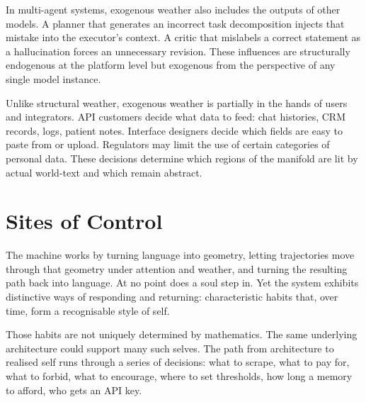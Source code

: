 \documentclass[12pt,a4paper]{article}
\begin{document}
In multi-agent systems, exogenous weather also includes the outputs of other models. A planner that generates an incorrect task decomposition injects that mistake into the executor's context. A critic that mislabels a correct statement as a hallucination forces an unnecessary revision. These influences are structurally endogenous at the platform level but exogenous from the perspective of any single model instance.

Unlike structural weather, exogenous weather is partially in the hands of users and integrators. API customers decide what data to feed: chat histories, CRM records, logs, patient notes. Interface designers decide which fields are easy to paste from or upload. Regulators may limit the use of certain categories of personal data. These decisions determine which regions of the manifold are lit by actual world-text and which remain abstract.

\section{Sites of Control}

The machine works by turning language into geometry, letting trajectories move through that geometry under attention and weather, and turning the resulting path back into language. At no point does a soul step in. Yet the system exhibits distinctive ways of responding and returning: characteristic habits that, over time, form a recognisable style of self.

Those habits are not uniquely determined by mathematics. The same underlying architecture could support many such selves. The path from architecture to realised self runs through a series of decisions: what to scrape, what to pay for, what to forbid, what to encourage, where to set thresholds, how long a memory to afford, who gets an API key.
\end{document}
